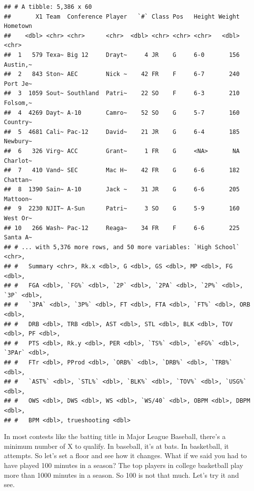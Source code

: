 \documentclass[
]{book}
\newenvironment{Shaded}{\begin{snugshade}}{\end{snugshade}}
\newcommand{\DataTypeTok}[1]{\textcolor[rgb]{0.13,0.29,0.53}{#1}}
\newcommand{\DecValTok}[1]{\textcolor[rgb]{0.00,0.00,0.81}{#1}}
\newcommand{\KeywordTok}[1]{\textcolor[rgb]{0.13,0.29,0.53}{\textbf{#1}}}
\newcommand{\NormalTok}[1]{#1}
\newcommand{\OperatorTok}[1]{\textcolor[rgb]{0.81,0.36,0.00}{\textbf{#1}}}
\newcommand{\StringTok}[1]{\textcolor[rgb]{0.31,0.60,0.02}{#1}}
\begin{document}
\begin{verbatim}
## # A tibble: 5,386 x 60
##       X1 Team  Conference Player   `#` Class Pos   Height Weight Hometown
##    <dbl> <chr> <chr>      <chr>  <dbl> <chr> <chr> <chr>   <dbl> <chr>   
##  1   579 Texa~ Big 12     Drayt~     4 JR    G     6-0       156 Austin,~
##  2   843 Ston~ AEC        Nick ~    42 FR    F     6-7       240 Port Je~
##  3  1059 Sout~ Southland  Patri~    22 SO    F     6-3       210 Folsom,~
##  4  4269 Dayt~ A-10       Camro~    52 SO    G     5-7       160 Country~
##  5  4681 Cali~ Pac-12     David~    21 JR    G     6-4       185 Newbury~
##  6   326 Virg~ ACC        Grant~     1 FR    G     <NA>       NA Charlot~
##  7   410 Vand~ SEC        Mac H~    42 FR    G     6-6       182 Chattan~
##  8  1390 Sain~ A-10       Jack ~    31 JR    G     6-6       205 Mattoon~
##  9  2230 NJIT~ A-Sun      Patri~     3 SO    G     5-9       160 West Or~
## 10   266 Wash~ Pac-12     Reaga~    34 FR    F     6-6       225 Santa A~
## # ... with 5,376 more rows, and 50 more variables: `High School` <chr>,
## #   Summary <chr>, Rk.x <dbl>, G <dbl>, GS <dbl>, MP <dbl>, FG <dbl>,
## #   FGA <dbl>, `FG%` <dbl>, `2P` <dbl>, `2PA` <dbl>, `2P%` <dbl>, `3P` <dbl>,
## #   `3PA` <dbl>, `3P%` <dbl>, FT <dbl>, FTA <dbl>, `FT%` <dbl>, ORB <dbl>,
## #   DRB <dbl>, TRB <dbl>, AST <dbl>, STL <dbl>, BLK <dbl>, TOV <dbl>, PF <dbl>,
## #   PTS <dbl>, Rk.y <dbl>, PER <dbl>, `TS%` <dbl>, `eFG%` <dbl>, `3PAr` <dbl>,
## #   FTr <dbl>, PProd <dbl>, `ORB%` <dbl>, `DRB%` <dbl>, `TRB%` <dbl>,
## #   `AST%` <dbl>, `STL%` <dbl>, `BLK%` <dbl>, `TOV%` <dbl>, `USG%` <dbl>,
## #   OWS <dbl>, DWS <dbl>, WS <dbl>, `WS/40` <dbl>, OBPM <dbl>, DBPM <dbl>,
## #   BPM <dbl>, trueshooting <dbl>
\end{verbatim}

In most contests like the batting title in Major League Baseball, there's a minimum number of X to qualify. In baseball, it's at bats. In basketball, it attempts. So let's set a floor and see how it changes. What if we said you had to have played 100 minutes in a season? The top players in college basketball play more than 1000 minutes in a season. So 100 is not that much. Let's try it and see.

\begin{Shaded}
\end{Shaded}
\end{document}
